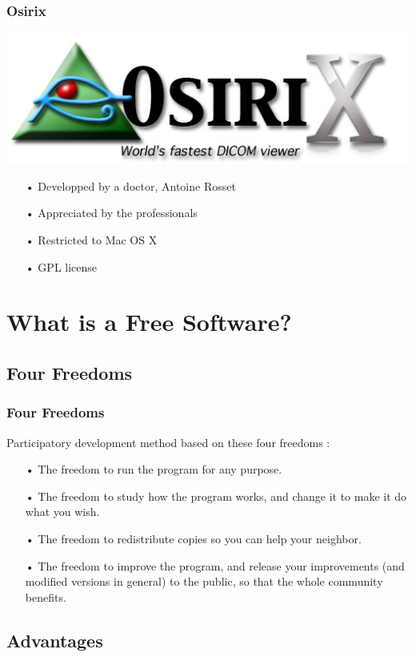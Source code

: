 \documentclass[11pt]{beamer}
\begin{document}
\begin{frame}
\frametitle{Osirix}
\includegraphics[scale=0.17]{Osirix.jpg}
\begin{itemize}[<+->]
\item[•] Developped by a doctor, Antoine Rosset
\item[•] Appreciated by the professionals
\item[•] Restricted to Mac OS X
\item[•] GPL license
\end{itemize}
\end{frame}

\section{What is a Free Software?}

\subsection{Four Freedoms}

\begin{frame}
\frametitle{Four Freedoms}
Participatory development method based on these four freedoms :
\begin{itemize}[<+->]
\item[•] The freedom to run the program for any purpose.
\item[•] The freedom to study how the program works, and change it to make it do what you wish.
\item[•] The freedom to redistribute copies so you can help your neighbor.
\item[•] The freedom to improve the program, and release your improvements (and modified versions in general) to the public, so that the whole community benefits.
\end{itemize}
\end{frame}

\subsection{Advantages}
\end{document}

